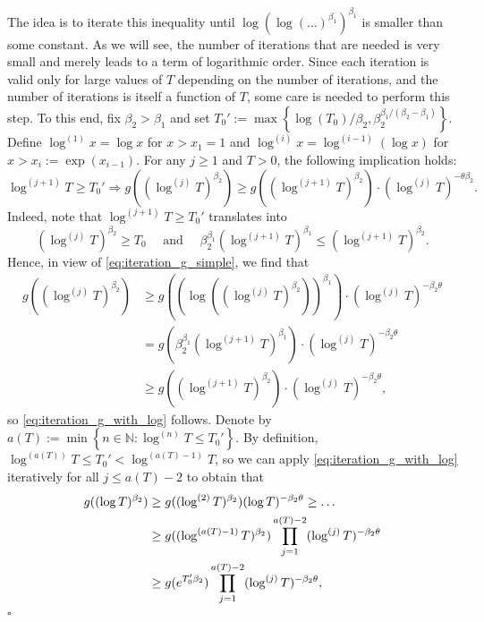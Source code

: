 \documentclass[11pt]{article}
\theoremstyle{plain}
\theoremstyle{definition}
\renewenvironment{proof}[1][] {\smallskip \noindent {\bf Proof#1.} }{\hspace*{\fill}$\square$\medskip\par}
\begin{document}
\begin{proof}
\begin{equation}
\end{equation}
The idea is to iterate this inequality until $\log(\log(\dots)^{\beta_1})^{\beta_1}$ is smaller than some constant. As we will see, the number of iterations that are needed is very small and merely leads to a term of logarithmic order. Since each iteration is valid only for large values of $T$ depending on the number of iterations, and the number of iterations is itself a function of $T$, some care is needed to perform this step. To this end, fix $\beta_2 > \beta_1$ and set $T_0' := \max{\left\lbrace {\log(T_0)/\beta_2, \beta_2^{\beta_1/(\beta_2 - \beta_1)}} \right\rbrace}$.
Define $\log^{(1)} x = \log x$ for $x > x_1 = 1$ and $\log^{(i)}x = \log^{(i-1)}(\log x)$ for $x > x_i :=\exp(x_{i-1})$. For any $j \ge 1$ and $T > 0$, the following implication holds:
\begin{equation}\label{eq:iteration_g_with_log}
   \log^{(j+1)} T \ge T_0' \Longrightarrow g((\log^{(j)} T)^{\beta_2}) \ge g((\log^{(j+1)} T)^{\beta_2}) \cdot (\log^{(j)} T)^{-\theta \beta_2}.
\end{equation}
Indeed, note that $\log^{(j+1)} T \ge T_0'$ translates into 
\[
  (\log^{(j)} T)^{\beta_2} \ge T_0 \quad \text{ and } \quad \beta_2^{\beta_1} (\log^{(j+1)} T)^{\beta_1} \le  (\log^{(j+1)} T )^{\beta_2}.
\]
Hence, in view of \eqref{eq:iteration_g_simple}, we find that
\begin{align*}
   g((\log^{(j)} T)^{\beta_2}) &\ge g((\log( (\log^{(j)} T)^{\beta_2}))^{\beta_1}) \cdot (\log^{(j)} T)^{-\beta_2 \theta} \\
 &= g(\beta_2^{\beta_1} (\log^{(j+1)} T)^{\beta_1}) \cdot (\log^{(j)} T)^{-\beta_2 \theta} \\
&\ge g( (\log^{(j+1)} T )^{\beta_2}) \cdot (\log^{(j)} T)^{-\beta_2 \theta},
\end{align*}
so \eqref{eq:iteration_g_with_log} follows. Denote by $a(T) := \min{\left\lbrace { n \in \mathbb{N} : \log^{(n)} T \le T_0'} \right\rbrace}$. By definition, $\log^{(a(T))} T \le T_0' < \log^{(a(T) - 1)} T$, so we can apply \eqref{eq:iteration_g_with_log} iteratively for all $j \le a(T) - 2$ to obtain that
\begin{align}
   g((\log T)^{\beta_2}) &\ge g((\log^{(2)} T)^{\beta_2}) (\log T)^{-\beta_2 \theta} \ge \dots \notag \\
&\ge g((\log^{(a(T) -1)} T)^{\beta_2}) \prod_{j=1}^{a(T) - 2} (\log^{(j)} T)^{-\beta_2 \theta} \notag\\
&\ge g(e^{T_0' \beta_2}) \prod_{j=1}^{a(T) - 2} (\log^{(j)} T)^{-\beta_2 \theta}, \label{eq:iteration_g_with_log_2}

\end{align}
\end{proof}
\end{document}
